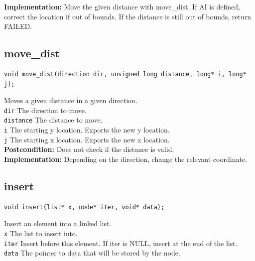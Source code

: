 \documentclass{article}
\begin{document}
 
 \textbf{Implementation:}
Move the given distance with  move\_dist.
If AI is defined, correct the location if out of bounds.
If the distance is still out of bounds, return FAILED.


\subsection{move\_dist}
\begin{lstlisting}
void move_dist(direction dir, unsigned long distance, long* i, long* j);
\end{lstlisting}


 Moves a given distance in a given direction.\\ 
 \texttt{dir} The direction to move.\\ 
 \texttt{distance} The distance to move.\\ 
 \texttt{i} The starting y location. Exports the new y location.\\ 
 \texttt{j} The starting x location. Exports the new x location.\\ 
 \textbf{Postcondition:} Does not check if the distance is valid.\\ 
 
 
 \textbf{Implementation:}
Depending on the direction, change the relevant coordinate.


\subsection{insert}
\begin{lstlisting}
void insert(list* x, node* iter, void* data);
\end{lstlisting}


  Insert an element into a linked list.\\ 
 \texttt{x} The list to insert into.\\ 
 \texttt{iter} Insert before this element. If  iter is NULL,
     insert at the end of the list.\\ 
 \texttt{data} The pointer to data that will be stored by the node.\\ 
 
\end{document}
